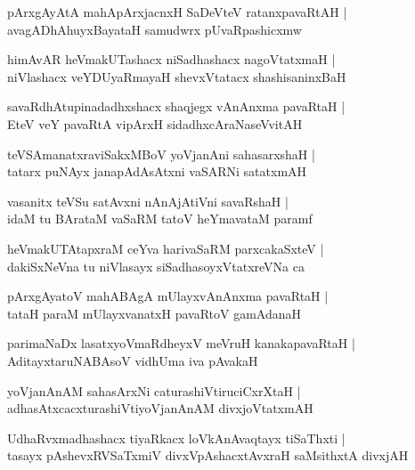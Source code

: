\documentclass[twoside,12pt,openright]{book}
\newcounter{shloka}[chapter]
\begin{document}
\begin{shloka}
pArxgAyAtA mahApArxjacnxH SaDeVteV ratanxpavaRtAH |\\
avagADhAhuyxBayataH samudwrx pUvaRpashicxmw
\end{shloka}

\begin{shloka}
himAvAR heVmakUTashacx niSadhashacx nagoVtatxmaH |\\
niVlashacx veYDUyaRmayaH shevxVtatacx shashisaninxBaH 
\end{shloka}

\begin{shloka}
savaRdhAtupinadadhxshacx shaqjegx vAnAnxma pavaRtaH |\\
EteV veY pavaRtA vipArxH sidadhxcAraNaseVvitAH
\end{shloka}

\begin{shloka}
teVSAmanatxraviSakxMBoV yoVjanAni sahasarxshaH |\\
tatarx puNAyx janapAdAsAtxni vaSARNi satatxmAH
\end{shloka}

\begin{shloka}
vasanitx teVSu satAvxni nAnAjAtiVni savaRshaH |\\
idaM tu BArataM vaSaRM tatoV heYmavataM paramf
\end{shloka}

\begin{shloka}
heVmakUTAtapxraM ceYva harivaSaRM parxcakaSxteV |\\
dakiSxNeVna tu niVlasayx siSadhasoyxVtatxreVNa ca
\end{shloka}

\begin{shloka}
pArxgAyatoV mahABAgA mUlayxvAnAnxma pavaRtaH |\\
tataH paraM mUlayxvanatxH pavaRtoV gamAdanaH
\end{shloka}

\begin{shloka}
parimaNaDx lasatxyoVmaRdheyxV meVruH kanakapavaRtaH |\\
AditayxtaruNABAsoV vidhUma iva pAvakaH
\end{shloka}

\begin{shloka}
yoVjanAnAM sahasArxNi caturashiVtiruciCxrXtaH |\\
adhasAtxcacxturashiVtiyoVjanAnAM divxjoVtatxmAH
\end{shloka}

\begin{shloka}
UdhaRvxmadhashacx tiyaRkacx loVkAnAvaqtayx tiSaThxti |\\
tasayx pAshevxRVSaTxmiV divxVpAshacxtAvxraH saMsithxtA divxjAH
\end{shloka}
\end{document}
